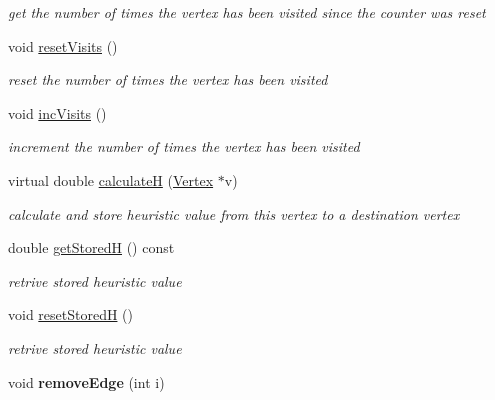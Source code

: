 \begin{DoxyCompactItemize}
\begin{DoxyCompactList}\small\item\em get the number of times the vertex has been visited since the counter was reset \end{DoxyCompactList}\item 
\hypertarget{class_vertex_a422fe102e53b0f35653fd22f250be8cf}{}void \hyperlink{class_vertex_a422fe102e53b0f35653fd22f250be8cf}{reset\+Visits} ()\label{class_vertex_a422fe102e53b0f35653fd22f250be8cf}

\begin{DoxyCompactList}\small\item\em reset the number of times the vertex has been visited \end{DoxyCompactList}\item 
\hypertarget{class_vertex_a6367bff88517bb53500eb1648c18b82e}{}void \hyperlink{class_vertex_a6367bff88517bb53500eb1648c18b82e}{inc\+Visits} ()\label{class_vertex_a6367bff88517bb53500eb1648c18b82e}

\begin{DoxyCompactList}\small\item\em increment the number of times the vertex has been visited \end{DoxyCompactList}\item 
virtual double \hyperlink{class_vertex_a17ef9b29d37ff0ddbc769802b2fb307e}{calculate\+H} (\hyperlink{class_vertex}{Vertex} $\ast$v)
\begin{DoxyCompactList}\small\item\em calculate and store heuristic value from this vertex to a destination vertex \end{DoxyCompactList}\item 
double \hyperlink{class_vertex_aaa2fa5fe6903406f9bef70617fb3a16e}{get\+Stored\+H} () const 
\begin{DoxyCompactList}\small\item\em retrive stored heuristic value \end{DoxyCompactList}\item 
\hypertarget{class_vertex_ab46427731c017d3cb63bdb9cf951bd71}{}void \hyperlink{class_vertex_ab46427731c017d3cb63bdb9cf951bd71}{reset\+Stored\+H} ()\label{class_vertex_ab46427731c017d3cb63bdb9cf951bd71}

\begin{DoxyCompactList}\small\item\em retrive stored heuristic value \end{DoxyCompactList}\item 
\hypertarget{class_vertex_a6c6def262e5b1950fc71bafe1d529899}{}void {\bfseries remove\+Edge} (int i)\label{class_vertex_a6c6def262e5b1950fc71bafe1d529899}

\end{DoxyCompactItemize}
